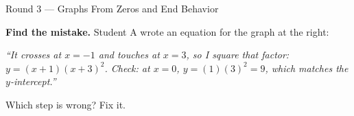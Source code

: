 \documentclass[12pt]{article}
\newcommand{\pgrid}[5]{%
  \draw[linegray!45, very thin, xstep=1, ystep=#5] (#1,#3) grid (#2,#4);
  \draw[->, semithick, charcoal] (#1,0)--(#2,0) node[right, font=\tiny, inner sep=1pt]{$x$};
  \draw[->, semithick, charcoal] (0,#3)--(0,#4) node[above, font=\tiny, inner sep=1pt]{$y$};}
\newcommand{\pcurve}[5]{%
  \begin{scope}\clip (#1,#3) rectangle (#2,#4);
    \draw[very thick, forest, domain=#1:#2, samples=160, smooth] plot (\x,{#5});
  \end{scope}}
\newcommand{\xtick}[1]{\foreach \t in {#1}{%
  \draw[charcoal] (\t,0) +(0,-2pt) -- +(0,2pt);
  \node[below, font=\tiny, inner sep=1.5pt, fill=white, fill opacity=0.8, text opacity=1]
    at (\t,0) {$\t$};}}
\newcommand{\ytick}[1]{\foreach \t in {#1}{%
  \draw[charcoal] (0,\t) +(-2pt,0) -- +(2pt,0);
  \node[left, font=\tiny, inner sep=1.5pt, fill=white, fill opacity=0.8, text opacity=1]
    at (0,\t) {$\t$};}}
\begin{document}
\begin{notesbox}{Round 3 --- Graphs From Zeros and End Behavior}
\vspace{6pt}
\noindent
\begin{minipage}[t]{0.66\linewidth}
\textbf{Find the mistake.} Student A wrote an equation for the graph at the right:\par
\vspace{2pt}
\emph{``It crosses at $x=-1$ and touches at $x=3$, so I square that factor:
$y=(x+1)(x+3)^2$. Check: at $x=0$, $y=(1)(3)^2=9$, which matches the $y$-intercept.''}\par
\vspace{2pt}
Which step is wrong? Fix it.
\end{minipage}\hfill
\begin{minipage}[t]{0.31\linewidth}
\vspace{0pt}\centering
{}
\end{minipage}\par
\vspace{2pt}
\\
\\
\end{notesbox}
\end{document}
